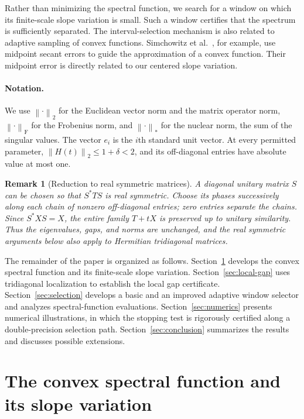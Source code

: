\documentclass[10pt,a4paper]{article}
\newtheorem{remark}{Remark}[section]
\newcommand{\norm}[1]{\left\lVert #1\right\rVert}
\begin{document}
Rather than minimizing the spectral function,
we search for a window on which its finite-scale
slope variation is small. Such a window certifies
that the spectrum is sufficiently separated.
The interval-selection mechanism is also related
to adaptive sampling of convex functions.
Simchowitz et al.~\cite{SimchowitzEtAl2018},
for example, use midpoint secant errors to
guide the approximation of a convex function.
Their midpoint error is directly related to
our centered slope variation.

\paragraph{Notation.}
We use $\norm{\cdot}_2$ for the Euclidean vector norm
and the matrix operator norm, $\norm{\cdot}_{\mathrm F}$
for the Frobenius norm, and $\norm{\cdot}_*$ for the
nuclear norm, the sum of the singular values.
The vector $e_i$ is the $i$th standard unit vector.
At every permitted parameter,
$\norm{H(t)}_2\leq1+\delta<2$, and its off-diagonal
entries have absolute value at most one.

\begin{remark}[Reduction to real symmetric matrices]
\label{rem:real}
A diagonal unitary matrix $S$ can be chosen so that
$S^*TS$ is real symmetric. Choose its phases
successively along each chain of nonzero
off-diagonal entries; zero entries separate
the chains. Since $S^*XS=X$, the entire family
$T+tX$ is preserved up to unitary similarity.
Thus the eigenvalues, gaps, and norms are
unchanged, and the real symmetric arguments
below also apply to Hermitian tridiagonal matrices.
\end{remark}

The remainder of the paper is organized as follows.
Section~\ref{sec:convex-spectral} develops the
convex spectral function and its finite-scale
slope variation. Section~\ref{sec:local-gap}
uses tridiagonal localization to establish
the local gap certificate.
Section~\ref{sec:selection} develops a basic
and an improved adaptive window selector
and analyzes spectral-function evaluations.
Section~\ref{sec:numerics} presents numerical
illustrations, in which the stopping test is
rigorously certified along a double-precision
selection path.
Section~\ref{sec:conclusion} summarizes
the results and discusses possible extensions.
\section{The convex spectral function and its slope variation}
\label{sec:convex-spectral}
\end{document}

